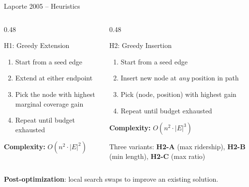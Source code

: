 \documentclass[aspectratio=169, 11pt]{beamer}
\begin{document}
\begin{frame}{Laporte 2005 -- Heuristics}

\begin{columns}[T]
\begin{column}{0.48\textwidth}
\begin{block}{H1: Greedy Extension}
\begin{enumerate}
    \item Start from a seed edge
    \item Extend at either endpoint
    \item Pick the node with highest marginal coverage gain
    \item Repeat until budget exhausted
\end{enumerate}
\vspace{0.15cm}
\small
\textbf{Complexity:} \(O(n^2 \cdot |E|^2)\)
\end{block}
\end{column}
\begin{column}{0.48\textwidth}
\begin{block}{H2: Greedy Insertion}
\begin{enumerate}
    \item Start from a seed edge
    \item Insert new node at \emph{any} position in path
    \item Pick (node, position) with highest gain
    \item Repeat until budget exhausted
\end{enumerate}
\vspace{0.15cm}
\small
\textbf{Complexity:} \(O(n^2 \cdot |E|^3)\)

\smallskip
Three variants: \textbf{H2-A} (max ridership), \textbf{H2-B} (min length), \textbf{H2-C} (max ratio)
\end{block}
\end{column}
\end{columns}

\vspace{0.2cm}
\textbf{Post-optimization}: local search swaps to improve an existing solution.
\end{frame}
\end{document}
